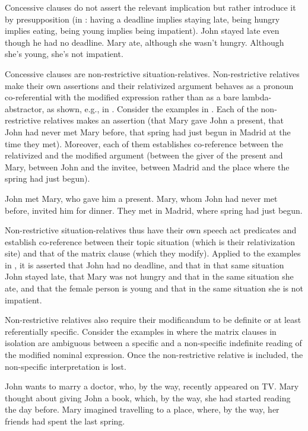 \documentclass[output=paper]{langscibook}
\begin{document}
Concessive clauses do not assert the relevant implication but rather introduce it by presupposition (in : having a deadline implies staying late, being hungry implies eating, being young implies being impatient).
\ea\label{ex:Concess1}
\ea John stayed late even though he had no deadline.
\ex Mary ate, although she wasn't hungry.
\ex Although she's young, she's not impatient.
\z\z

\noindent Concessive clauses are non-restrictive situation-relatives. Non-restrictive relatives make their own assertions and their relativized argument behaves as a pronoun co-referential with the modified expression rather than as a bare lambda-abstractor, as shown, e.g., in \citet{Vries2002}. Consider the examples in . Each of the non-restrictive relatives makes an assertion (that Mary gave John a present, that John had never met Mary before, that spring had just begun in Madrid at the time they met). Moreover, each of them establishes co-reference between the relativized and the modified argument (between the giver of the present and Mary, between John and the invitee, between Madrid and the place where the spring had just begun).

\ea\label{ex:RealRel1}
\ea John met Mary, who gave him a present.
\ex Mary, whom John had never met before, invited him for dinner.
\ex They met in Madrid, where spring had just begun.
\z\z

\noindent Non-restrictive situation-relatives thus have their own speech act predicates and establish co-reference between their topic situation (which is their relativization site) and that of the matrix clause (which they modify). Applied to the examples in , it is asserted that John had no deadline, and that in that same situation John stayed late, that Mary was not hungry and that in the same situation she ate, and that the female person is young and that in the same situation she is not impatient.

Non-restrictive relatives also require their modificandum to be definite or at least referentially specific. Consider the examples in  where the matrix clauses in isolation are ambiguous between a specific and a non-specific indefinite reading of the modified nominal expression. Once the non-restrictive relative is included, the non-specific interpretation is lost.

\ea\label{ex:RealRel2}
\ea John wants to marry a doctor, who, by the way, recently appeared on TV.
\ex Mary thought about giving John a book, which, by the way, she had started reading the day before.
\ex Mary imagined travelling to a place, where, by the way, her friends had spent the last spring.
\z\z
\end{document}
